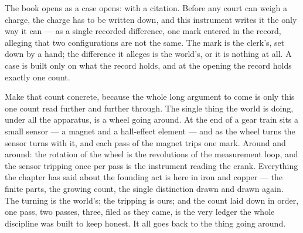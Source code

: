 %
%

\noindent The book opens as a case opens: with a citation. Before any court can weigh a charge, the charge
has to be written down, and this instrument writes it the only way it can --- as a single recorded difference,
one mark entered in the record, alleging that two configurations are not the same. The mark is the clerk's, set
down by a hand; the difference it alleges is the world's, or it is nothing at all. A case is built only on what
the record holds, and at the opening the record holds exactly one count.

Make that count concrete, because the whole long argument to come is only this one count read further and
further through. The single thing the world is doing, under all the apparatus, is a wheel going around. At the
end of a gear train sits a small sensor --- a magnet and a hall-effect element --- and as the wheel turns the
sensor turns with it, and each pass of the magnet trips one mark. Around and around: the rotation of the wheel
is the revolutions of the measurement loop, and the sensor tripping once per pass is the instrument reading the
crank. Everything the chapter has said about the founding act is here in iron and copper --- the finite parts,
the growing count, the single distinction drawn and drawn again. The turning is the world's; the tripping is
ours; and the count laid down in order, one pass, two passes, three, filed as they came, is the very ledger the
whole discipline was built to keep honest. It all goes back to the thing going around.

